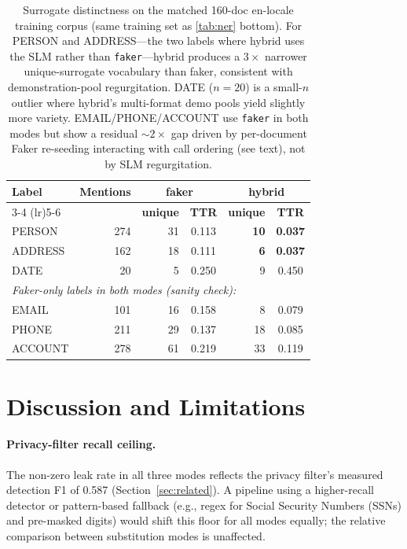 \documentclass[11pt]{article}
\newcommand{\code}[1]{\texttt{#1}}
\newcommand{\faker}{\code{faker}}
\begin{document}
\begin{table}[t]
\centering
\caption{Surrogate distinctness on the matched 160-doc en-locale
training corpus (same training set as \cref{tab:ner} bottom). For
PERSON and ADDRESS---the two labels where hybrid uses the SLM rather
than \faker{}---hybrid produces a $3\times$ narrower unique-surrogate
vocabulary than faker, consistent with demonstration-pool regurgitation.
DATE ($n{=}20$) is a small-$n$ outlier where hybrid's multi-format
demo pools yield slightly more variety. EMAIL/PHONE/ACCOUNT use
\faker{} in both modes but show a residual $\sim$$2\times$ gap driven
by per-document Faker re-seeding interacting with call ordering (see
text), not by SLM regurgitation.}
\label{tab:distinctness}
\setlength{\tabcolsep}{6pt}
\begin{tabular}{l r r c r c}
\toprule
\textbf{Label} & \textbf{Mentions}
& \multicolumn{2}{c}{\textbf{faker}}
& \multicolumn{2}{c}{\textbf{hybrid}} \\
\cmidrule(lr){3-4} \cmidrule(lr){5-6}
       &     & \textbf{unique} & \textbf{TTR}
             & \textbf{unique} & \textbf{TTR} \\
\midrule
PERSON  & 274 & 31 & 0.113 & \textbf{10} & \textbf{0.037} \\
ADDRESS & 162 & 18 & 0.111 & \textbf{6}  & \textbf{0.037} \\
DATE    &  20 &  5 & 0.250 & 9           & 0.450          \\
\midrule
\multicolumn{6}{l}{\emph{Faker-only labels in both modes (sanity check):}} \\
EMAIL   & 101 & 16 & 0.158 & 8 & 0.079 \\
PHONE   & 211 & 29 & 0.137 & 18 & 0.085 \\
ACCOUNT & 278 & 61 & 0.219 & 33 & 0.119 \\
\bottomrule
\end{tabular}
\end{table}

\section{Discussion and Limitations}
\label{sec:limits}

\paragraph{Privacy-filter recall ceiling.}
The non-zero leak rate in all three modes reflects the privacy
filter's measured detection F1 of 0.587 (Section~\ref{sec:related}).
A pipeline using a higher-recall
detector or pattern-based fallback (e.g., regex for Social Security
Numbers (SSNs) and pre-masked digits) would shift this floor for all
modes equally; the relative comparison between substitution modes is
unaffected.
\end{document}
